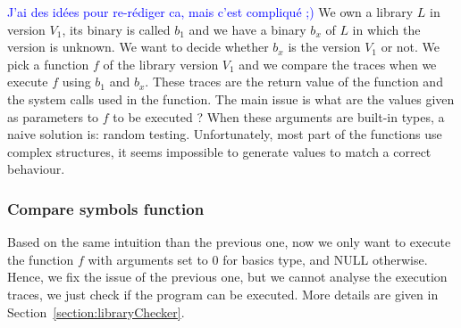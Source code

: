 \documentclass{article}
\newcommand{\ludo}[1]{\textcolor{blue}{#1}}
\newcommand{\symb}{{symbols}}
\newcommand{\comp}{{compilation}}
\begin{document}

    \ludo{J'ai des idées pour re-rédiger ca, mais c'est compliqué ;)}
    We own a library $L$ in version $V_1$, its binary is called $b_1$ and we
    have a binary $b_x$ of $L$ in which the version is unknown. We want to
    decide whether $b_x$ is the version $V_1$ or not. We pick a function $f$
    of the library version $V_1$ and we compare the traces when we execute $f$
    using $b_1$ and $b_x$.	These traces are the return value of the function
    and the system calls used in the function.  The main issue is what are the
    values given as parameters to $f$ to be executed ? When these arguments
    are built-in types, a naive solution is: random testing. Unfortunately,
    most part of the functions use complex structures, it seems impossible to
    generate values to match a correct behaviour.
	
	\subsubsection{Compare symbols function}
	
    Based on the same intuition than the previous one, now we only want to
    execute the function $f$ with arguments set to $0$ for basics type, and
    NULL otherwise. Hence, we fix the issue of the previous one, but we cannot
    analyse the execution traces, we just check if the program can be
    executed. More details are given in Section~\ref{section:libraryChecker}.
\end{document}
